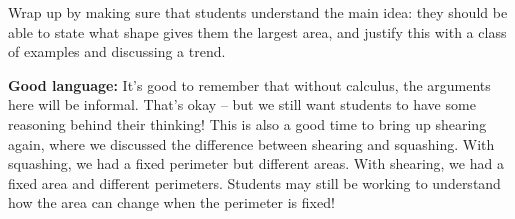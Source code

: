 \documentclass[noauthor,nooutcomes, handout]{ximera}
\begin{document}
\begin{instructorNotes}
Wrap up by making sure that students understand the main idea: they should be able to state what shape gives them the largest area, and justify this with a class of examples and discussing a trend.


{\bf Good language:} It's good to remember that without calculus, the arguments here will be informal. That's okay -- but we still want students to have some reasoning behind their thinking! This is also a good time to bring up shearing again, where we discussed the difference between shearing and squashing. With squashing, we had a fixed perimeter but different areas. With shearing, we had a fixed area and different perimeters. Students may still be working to understand how the area can change when the perimeter is fixed!



\end{instructorNotes}
\end{document}
